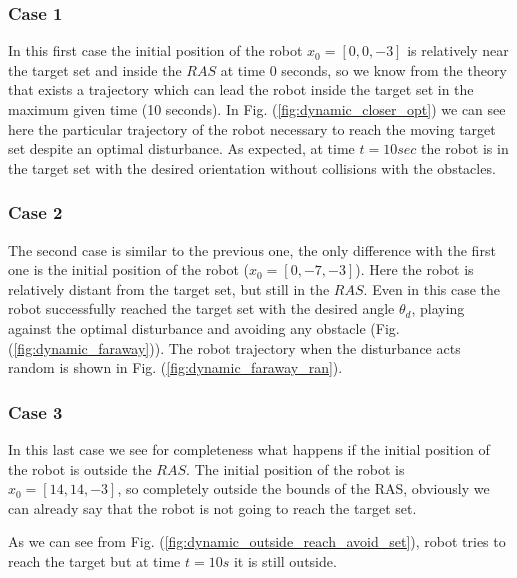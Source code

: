 \subsubsection{Case 1}
In this first case the initial position of the robot $x_0 = [0, 0, -3]$ is relatively near the target set and inside the $RAS$ at time 0 seconds, so we know from the theory that exists a trajectory which can lead the robot inside the target set in the maximum given time (10 seconds).
In Fig. (\ref{fig:dynamic_closer_opt}) we can see here the particular trajectory of the robot necessary to reach the moving target set despite an optimal disturbance. As expected, at time $t=10sec$ the robot is in the target set with the desired orientation without collisions with the obstacles.

\subsubsection{Case 2}
The second case is similar to the previous one, the only difference with the first one is the initial position of the robot ($x_0 = [0, -7, -3]$). Here the robot is relatively distant from the target set, but still in the $RAS$. Even in this case the robot successfully reached the target set with the desired angle $\theta_d$, playing against the optimal disturbance and avoiding any obstacle (Fig. (\ref{fig:dynamic_faraway})). The robot trajectory when the disturbance acts random is shown in Fig. (\ref{fig:dynamic_faraway_ran}).  

\subsubsection{Case 3}
In this last case we see for completeness what happens if the initial position of the robot is outside the $RAS$. The initial position of the robot is $x_0 = [14, 14, -3]$, so completely outside the bounds of the RAS, obviously we can already say that the robot is not going to reach the target set.

As we can see from Fig. (\ref{fig:dynamic_outside_reach_avoid_set}), robot tries to reach the target but at time $t=10s$ it is still outside.
        

